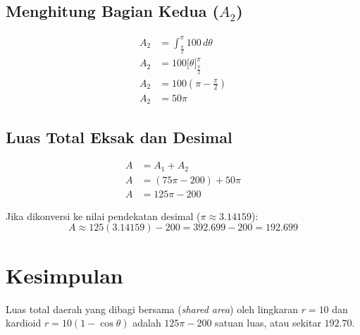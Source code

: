 \documentclass[11pt,a4paper]{article}
\begin{document}
\subsection{Menghitung Bagian Kedua ($A_2$)}
\begin{align*}
  A_2 &= \int_{\frac{\pi}{2}}^{\pi} 100 \, d\theta \\
  A_2 &= 100 \Big[ \theta \Big]_{\frac{\pi}{2}}^{\pi} \\
  A_2 &= 100 \left( \pi - \frac{\pi}{2} \right) \\
  A_2 &= 50\pi
\end{align*}

\subsection{Luas Total Eksak dan Desimal}
\begin{align*}
  A &= A_1 + A_2 \\
  A &= (75\pi - 200) + 50\pi \\
  A &= 125\pi - 200
\end{align*}

Jika dikonversi ke nilai pendekatan desimal ($\pi \approx 3.14159$):
\begin{equation*}
  A \approx 125(3.14159) - 200 = 392.699 - 200 = 192.699
\end{equation*}

\section{Kesimpulan}
Luas total daerah yang dibagi bersama (\textit{shared area}) oleh lingkaran $r = 10$ dan kardioid $r = 10(1 - \cos\theta)$ adalah \textbf{$125\pi - 200$} satuan luas, atau sekitar \textbf{$192.70$}.
\end{document}
